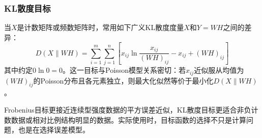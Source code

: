 \subsubsection{KL散度目标}
当$X$是计数矩阵或频数矩阵时，常用如下广义KL散度度量$X$和$Y=WH$之间的差异：
\begin{equation*}
	D(X\|WH)=\sum_{i=1}^{m}\sum_{j=1}^{n}\left[x_{ij}\ln\frac{x_{ij}}{(WH)_{ij}}-x_{ij}+(WH)_{ij}\right]
\end{equation*}
其中约定$0\ln0=0$。这一目标与Poisson模型关系密切：若$x_{ij}$近似服从均值为$(WH)_{ij}$的Poisson分布且各元素独立，则最大化似然等价于最小化$D(X\|WH)$。

\begin{note}
	Frobenius目标更接近连续型强度数据的平方误差近似，KL散度目标更适合非负计数数据或相对比例结构明显的数据。实际使用时，目标函数的选择不只是计算问题，也是在选择误差模型。
\end{note}